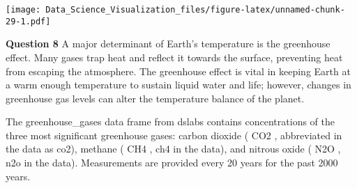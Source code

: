 \documentclass[]{article}
\newenvironment{Shaded}{\begin{snugshade}}{\end{snugshade}}
\newcommand{\DataTypeTok}[1]{\textcolor[rgb]{0.13,0.29,0.53}{#1}}
\newcommand{\DecValTok}[1]{\textcolor[rgb]{0.00,0.00,0.81}{#1}}
\newcommand{\FloatTok}[1]{\textcolor[rgb]{0.00,0.00,0.81}{#1}}
\newcommand{\KeywordTok}[1]{\textcolor[rgb]{0.13,0.29,0.53}{\textbf{#1}}}
\newcommand{\NormalTok}[1]{#1}
\newcommand{\OperatorTok}[1]{\textcolor[rgb]{0.81,0.36,0.00}{\textbf{#1}}}
\newcommand{\StringTok}[1]{\textcolor[rgb]{0.31,0.60,0.02}{#1}}
\begin{document}
\begin{Shaded}
\end{Shaded}

\texttt{[image: Data\_Science\_Visualization\_files/figure-latex/unnamed-chunk-29-1.pdf]}

\textbf{Question 8} A major determinant of Earth's temperature is the
greenhouse effect. Many gases trap heat and reflect it towards the
surface, preventing heat from escaping the atmosphere. The greenhouse
effect is vital in keeping Earth at a warm enough temperature to sustain
liquid water and life; however, changes in greenhouse gas levels can
alter the temperature balance of the planet.

The greenhouse\_gases data frame from dslabs contains concentrations of
the three most significant greenhouse gases: carbon dioxide ( CO2 ,
abbreviated in the data as co2), methane ( CH4 , ch4 in the data), and
nitrous oxide ( N2O , n2o in the data). Measurements are provided every
20 years for the past 2000 years.
\end{document}
